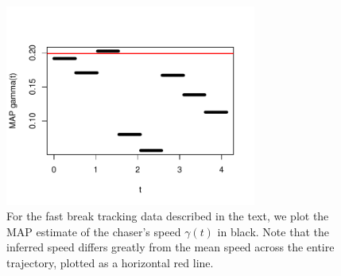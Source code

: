 \documentclass[graybox]{svmult}
\begin{document}
\begin{figure}
\vspace{-0.5in}
\begin{center}
\includegraphics[width=3.25in]{inferredgamma}
\end{center}
\vspace{-0.25in}
\caption{For the fast break tracking data described in the text, we
  plot the MAP estimate of the chaser's speed $\gamma(t)$ in black.
  Note that the inferred speed differs greatly from the mean speed
  across the entire trajectory, plotted as a horizontal red line.}
\label{fig:inferredgamma}
\end{figure}


\vspace{-0.25in}



\end{document}
